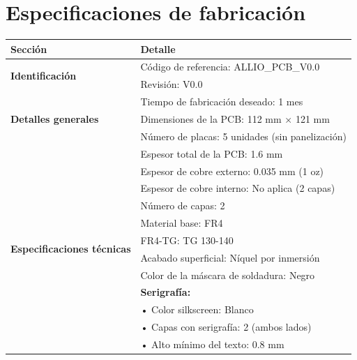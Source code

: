 \documentclass{reporti}
\begin{document}
\section{Especificaciones de fabricación}
\begin{table}[H]
  \centering
  \begin{tabularx}{\textwidth}{lX}
    \toprule
    \textbf{Sección} & \textbf{Detalle} \\
    \midrule

    \multirow{2}{*}{\textbf{Identificación}} 
    & Código de referencia: ALLIO\_PCB\_V0.0 \\
    & Revisión: V0.0 \\
    \cmidrule(lr){1-2}

    \multirow{3}{*}{\textbf{Detalles generales}} 
    & Tiempo de fabricación deseado: 1 mes \\
    & Dimensiones de la PCB: 112 mm × 121 mm \\
    & Número de placas: 5 unidades (sin panelización) \\
    \cmidrule(lr){1-2}

    \multirow{12}{*}{\textbf{Especificaciones técnicas}} 
    & Espesor total de la PCB: 1.6 mm \\
    & Espesor de cobre externo: 0.035 mm (1 oz) \\
    & Espesor de cobre interno: No aplica (2 capas) \\
    & Número de capas: 2 \\
    & Material base: FR4 \\
    & FR4-TG: TG 130-140 \\
    & Acabado superficial: Níquel por inmersión \\
    & Color de la máscara de soldadura: Negro \\
    & \textbf{Serigrafía:} \\
    & \quad • Color silkscreen: Blanco \\
    & \quad • Capas con serigrafía: 2 (ambos lados) \\
    & \quad • Alto mínimo del texto: 0.8 mm \\
    \cmidrule(lr){1-2}


\end{tabularx}
\end{table}
\end{document}
